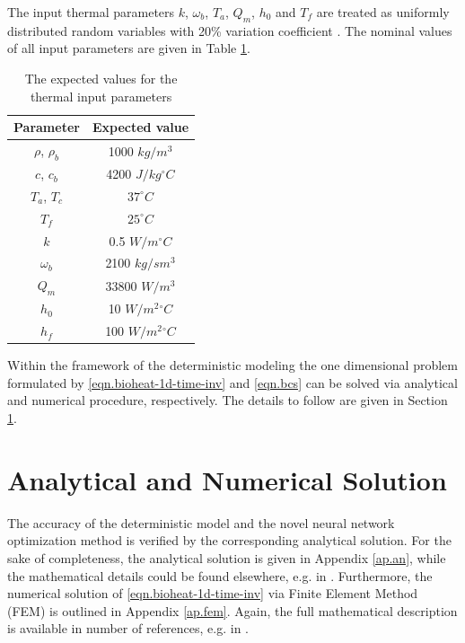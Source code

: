 \documentclass[conference]{IEEEtran}
\begin{document}
The input thermal parameters $k$, $\omega_b$, $T_a$, $Q_m$, $h_0$ and $T_f$ are treated as uniformly distributed random variables with 20\% variation coefficient \cite{anna_bioheat_2019}. The nominal values of all input parameters are given in Table \ref{table.params}.
\begin{table}[htbp]
\caption{The expected values for the thermal input parameters}
\begin{center}
\begin{tabular}{|c|c|}
\hline
\textbf{Parameter} & \textbf{Expected value}\\
\hline
$\rho$, $\rho_b$ & 1000 $kg/m^3$\\
\hline
$c$, $c_b$ & 4200 $J/kg {}^\circ C$\\
\hline
$T_a$, $T_c$ & ${37}^\circ C$\\
\hline
$T_f$ & ${25}^\circ C$\\
\hline
$k$ & 0.5 $W/m {}^\circ C$\\
\hline
$\omega_b$ & 2100 $kg/sm^3$\\
\hline
$Q_m$ & 33800 $W/m^3$\\
\hline
$h_0$ & 10 $W/m^2 {}^\circ C$\\
\hline
$h_f$ & 100 $W/m^2 {}^\circ C$\\
\hline
\end{tabular}
\label{table.params}
\end{center}
\end{table}
Within the framework of the deterministic modeling the one dimensional problem formulated by \eqref{eqn.bioheat-1d-time-inv} and \eqref{eqn.bcs} can be solved via analytical and numerical procedure, respectively. The details to follow are given in Section \ref{sec.analytical-numerical}.


\section{Analytical and Numerical Solution}
\label{sec.analytical-numerical}
The accuracy of the deterministic model and the novel neural network optimization method is verified by the corresponding analytical solution. For the sake of completeness, the analytical solution is given in Appendix \ref{ap.an}, while the mathematical details could be found elsewhere, e.g. in \cite{deng_bioheat_2002}.
Furthermore, the numerical solution of \eqref{eqn.bioheat-1d-time-inv} via Finite Element Method (FEM) is outlined in Appendix \ref{ap.fem}. Again, the full mathematical description is available in number of references, e.g. in \cite{poljak_bioem_2018}.
\end{document}
